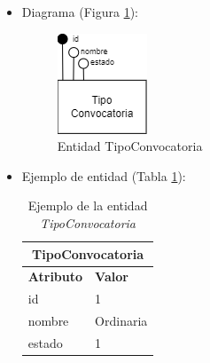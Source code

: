 \begin{itemize}
\begin{itemize}
        \item estado
        \begin{itemize}
            \item Definición: estado del tipo de convocatoria.
            \item Dominio: 1 (Habilitado), 0 (Deshabilitado).
            \item Tipo: atributo simple.
            \item Opcional: no
            \item Ejemplo: 1
        \end{itemize}
    \end{itemize}

    \item Diagrama (Figura \ref{fig:E-TipoConvocatoria}):

    \begin{figure}[H]
        \centering
        \includegraphics[scale=0.8]{img/diagramas/EER/E-TipoConvocatoria.png}
        \caption{Entidad TipoConvocatoria}
        \label{fig:E-TipoConvocatoria}
    \end{figure}

    \item Ejemplo de entidad (Tabla \ref{table:T-TipoConvocatoria}):

    \begin{table}[H]
    \centering
        \begin{tabular}{ |p{6cm}||p{6cm}|  }
             \hline
                \multicolumn{2}{|c|}{\textbf{TipoConvocatoria}} \\
             \hline
                 \textbf{Atributo} & \textbf{Valor} \\
             \hline
                 id & 1 \\
             \hline
                 nombre & Ordinaria \\
             \hline
                 estado & 1 \\
        \end{tabular}
        \caption{Ejemplo de la entidad \textit{TipoConvocatoria}}
        \label{table:T-TipoConvocatoria}
    \end{table}
\end{itemize}

